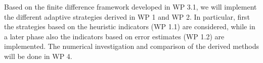 \documentclass[enabledeprecatedfontcommands,cleardoublepage=empty,headsepline,twoside,11pt,DIV=15,BCOR=12mm,final]{scrartcl}
\begin{document}
 Based on the finite difference framework developed in WP 3.1, we will implement the different adaptive strategies derived in WP 1 and WP 2. In particular, first the strategies based on the heuristic indicators (WP 1.1) are considered, while in a later phase also the indicators based on error estimates (WP 1.2) are implemented. %
The numerical investigation and comparison of the derived methods will be done in WP 4.
 
\end{document}
